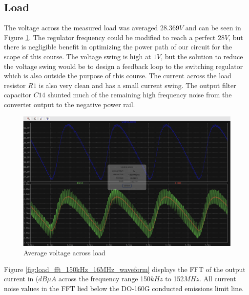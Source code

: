 \documentclass[conference]{IEEEtran}
\begin{document}
\subsection{Load}

The voltage across the measured load was averaged 28.369$V$ and can be seen in Figure \ref{fig:load_average_voltage_waveform}. The regulator frequency could be modified to reach a perfect 28$V$, but there is negligible benefit in optimizing the power path of our circuit for the scope of this course. The voltage swing is high at $1V$, but the solution to reduce the voltage swing would be to design a feedback loop to the switching regulator which is also outside the purpose of this course. The current across the load resistor $R1$ is also very clean and has a small current swing. The output filter capacitor $C14$ shunted much of the remaining high frequency noise from the converter output to the negative power rail.

\begin{figure}[htp]
    \centering
    \includegraphics[width=1.0\linewidth]{load_average_voltage.png}
    \caption{Average voltage across load}
    \label{fig:load_average_voltage_waveform}
\end{figure}

Figure \ref{fig:load_fft_150kHz_16MHz_waveform} displays the FFT of the output current in ($dB \mu A$ across the frequency range 150$kHz$ to 152$MHz$. All current noise values in the FFT lied below the DO-160G conducted emissions limit line.
\end{document}

